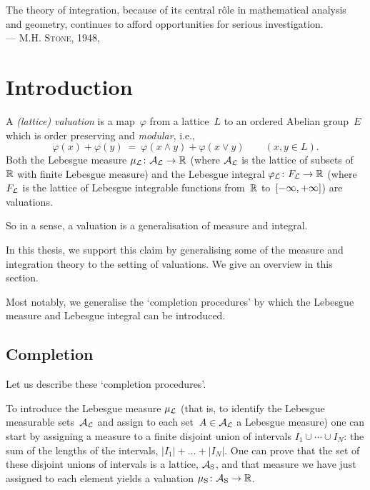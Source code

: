 \documentclass[main.tex]{subfiles}
\begin{document}
\begin{flushright}
\begin{minipage}{.7\columnwidth}
\begin{flushright}
The theory of integration,
because of its 
central r\^ole 
in mathematical analysis and geometry,
continues to afford opportunities 
for serious investigation.\\
--- \textsc{M.H. Stone}, 1948, \cite{Stone48}
\end{flushright}
\end{minipage}
\end{flushright}

\section{Introduction}
\noindent
A \emph{(lattice) valuation}
is a map~$\varphi$ from a lattice~$L$
to an ordered Abelian group~$E$
which is order preserving and \emph{modular}, i.e.,
\begin{equation*}
\varphi(x)+\varphi(y) \ =\ 
\varphi(x\wedge y)+ \varphi(x \vee y)
\qquad(x,y\in L).
\end{equation*}
Both the Lebesgue measure 
$\mu_{\mathcal{L}}\colon \mathcal{A}_{\mathcal{L}} \rightarrow \mathbb{R}$
(where $\mathcal{A}_{\mathcal{L}}$ is the lattice of subsets of~$\mathbb{R}$ with finite Lebesgue measure)
and the Lebesgue integral 
$\varphi_{\mathcal{L}}\colon F_{\mathcal{L}} \rightarrow \mathbb{R}$ 
(where $F_{\mathcal{L}}$ is the lattice of Lebesgue integrable functions from~$\mathbb{R}$
to~${[-\infty,+\infty]}$) 
are valuations.

So in a sense, a  valuation
is a generalisation of measure and integral.



In this thesis,
we support this claim by generalising some
of the measure and integration theory to 
the setting of  valuations.
We give an overview in this section.

Most notably,
we generalise the `completion procedures'
by which the Lebesgue measure and
Lebesgue integral can be introduced.


\subsection{Completion}
Let us describe these `completion procedures'.

To introduce the Lebesgue measure $\mu_{\mathcal{L}}$
(that is,
to identify the Lebesgue measurable sets~$\mathcal{A}_{\mathcal{L}}$
and assign to each set~$A\in\mathcal{A}_{\mathcal{L}}$ a Lebesgue measure)
one can start by
assigning a measure to a finite disjoint union
of intervals 
$I_1 \cup\dotsb\cup I_N$:
the sum of the lengths of the intervals,
$|I_1|+\dots+|I_N|$.
One can prove that the set of these disjoint
unions of intervals is a lattice, $\mathcal{A}_{\mathrm{S}}$,
and that measure we have just assigned
to each element
yields  a valuation $\mu_{\mathrm{S}}\colon \mathcal{A}_{\mathrm{S}}\rightarrow\mathbb{R}$.
\end{document}
